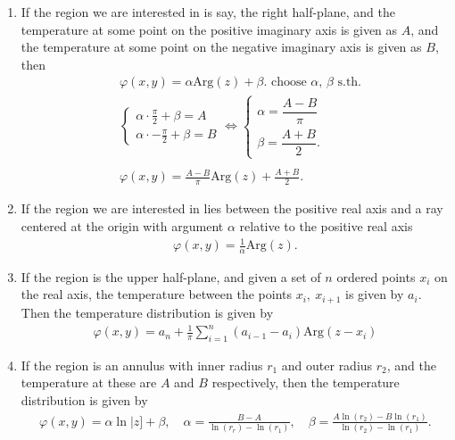 \documentclass[12pt, a4paper]{article}
\theoremstyle{plain}
\theoremstyle{definition}
\begin{document}
\begin{enumerate}
				\item 
					If the region we are interested in is say, the right half-plane, and the temperature at some point on the positive imaginary axis is given as $A$, and the temperature at some point on the negative imaginary axis is given as $B$, then
					\begin{align*}
						&\varphi(x,y) = \alpha \mathrm{Arg}(z)+\beta. \text{ choose $\alpha$, $\beta$ s.th.}\\&
						\begin{cases}
							\alpha\cdot\frac{\pi}{2}+\beta = A\\
							\alpha\cdot - \frac{\pi}{2} + \beta = B
						\end{cases}\iff
						\begin{cases}
							\alpha = \dfrac{A-B}{\pi}\\[0.3cm]
							\beta = \dfrac{A+B}{2}.
						\end{cases}\\\\
						&\varphi(x,y) = \frac{A-B}{\pi}\mathrm{Arg}(z) + \frac{A+B}{2}.
					\end{align*}

				\item 
					If the region we are interested in lies between the positive real axis and a ray centered at the origin with argument $\alpha$ relative to the positive real axis
					\begin{align*}
						\varphi(x,y) = \frac{1}{\alpha}\mathrm{Arg}(z).
					\end{align*}

				\item 
					If the region is the upper half-plane, and given a set of $n$ ordered points $x_i$ on the real axis, the temperature between the points $x_i,\:x_{i+1}$ is given by $a_i$. Then the temperature distribution is given by
					\begin{align*}
						\varphi(x,y) = a_n + \frac{1}{\pi}\sum\limits_{i=1}^{n}(a_{i-1}-a_i)\mathrm{Arg}(z-x_i)
					\end{align*}

				\item 
					If the region is an annulus with inner radius $r_1$ and outer radius $r_2$, and the temperature at these are $A$ and $B$ respectively, then the temperature distribution is given by
					\begin{align*}
						\varphi(x,y) = \alpha\ln|z] + \beta,\quad \alpha=\frac{B-A}{\ln(r_r)-\ln(r_1)},\quad \beta = \frac{A\ln(r_2)-B\ln(r_1)}{\ln(r_2)-\ln(r_1)}.
					\end{align*}
			\end{enumerate}
\end{document}
